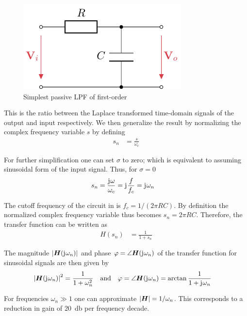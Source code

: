 \begin{figure}[htb!]
  \centering
  \includegraphics[scale=1]{figures/electronics/lowpass/lp_passive_1ord/lp_passive_1ord}
  \caption[Passive first-order \ac{LPF}]{Simplest passive \ac{LPF} of first-order%
    \label{fig:lp_passive_1ord}}
\end{figure}

This is the ratio between the Laplace transformed time-domain signals of the output and input respectively. We then generalize the result by normalizing the complex frequency variable $s$ by defining
\begin{align}
  s_n &= \frac{s}{\omega_c}
\end{align}

For further simplification one can set $\sigma$ to zero; which is equivalent to assuming sinusoidal form of the input signal.
Thus, for $\sigma=0$
\begin{align}
  s_n &= \frac{\mathrm{j}\mkern1mu\omega}{\omega_c} = \mathrm{j}\mkern1mu\frac{f}{f_c} = \mathrm{j}\mkern1mu\omega_n
\end{align}

The cutoff frequency of the circuit in  is $f_c=1/(2\pi RC)$. By definition the normalized complex frequency variable thus becomes $s_n=2\pi RC$. Therefore, the transfer function can be written as
\begin{align}
  H(s_n) &= \frac{1}{1+s_n}
\end{align}

The magnitude $\abs{\bm{H}(\mathrm{j}\mkern1mu\omega_n)}$ and phase $\varphi=\angle\bm{H}(\mathrm{j}\mkern1mu\omega_n)$ of the transfer function for sinusoidal signals are then given by
\begin{align}
  \abs{\bm{H}(\mathrm{j}\mkern1mu\omega_n)}^2 &= \frac{1}{1+\omega_n^2} &&\text{and} &\varphi &= \angle\bm{H}(\mathrm{j}\mkern1mu\omega_n) = \arctan\frac{1}{1 + \mathrm{j}\mkern1mu\omega_n}
\end{align}

For frequencies $\omega_n\gg 1$ one can approximate $\abs{\bm{H}}=1/\omega_n$. This corresponds to a reduction in gain of \SI{20}{\decibel} per frequency decade.

